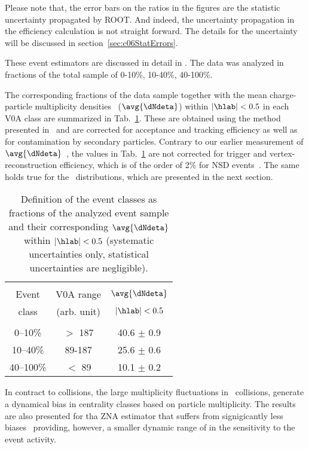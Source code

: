 Please note that,
the error bars on the ratios in the figures are the statistic uncertainty
propagated by ROOT.
And indeed, the uncertainty propagation in the efficiency calculation is not
straight forward.
The details for the uncertainty will be discussed
in section~\ref{sec:c06StatErrors}.

These event estimators are discussed in detail in \cite{Adam:2014qja}. The data was analyzed in fractions of the total sample of 0-10\%, 10-40\%, 40-100\%.

The corresponding fractions of the data sample together with the mean charge-particle multiplicity densities ~($\avg{\dNdeta}$) within $| \hlab |<0.5$ in each V0A class are summarized in Tab.~\ref{tab:multclasses}.
These are obtained using the method presented in~\cite{ALICE:2012xs} and are corrected for acceptance and
tracking efficiency as well as for contamination by secondary
particles. Contrary to our earlier measurement of $\avg{\dNdeta}$~\cite{ALICE:2012xs}, the values
in Tab.~\ref{tab:multclasses} are not corrected for trigger and
vertex-reconstruction efficiency, which is of the order of 2\% for NSD
events~\cite{ALICE:2012xs}. The same holds true for the \pt\
distributions, which are presented in the next section.

\begin{table}[t]
  \centering
  \begin{tabular*}{\linewidth}{@{\extracolsep{\fill}}ccc}
    \hline
    &&\\[-0.7em]
     Event & V0A range & $\avg{\dNdeta}$\\
     class & \footnotesize{(arb. unit)} & \footnotesize{$|\hlab|<0.5$}\\[0.3em]
    \hline
    &&\\[-0.7em]
    0--10\%   & $>$ 187  & 40.6 $\pm$ 0.9 \\[0.3em]
    10--40\%  & 89-187   & 25.6 $\pm$ 0.6 \\[0.3em]
    40--100\% & $<$ 89   & 10.1 $\pm$ 0.2 \\[0.3em]
    \hline
  \end{tabular*}
  \caption{Definition of the event classes as fractions of the analyzed event sample and their corresponding $\avg{\dNdeta}$ within $|\hlab|<0.5$ (systematic uncertainties only, statistical uncertainties are negligible).  }
  \label{tab:multclasses}
\end{table}

In contract to \PbPb collisions, the large multiplicity fluctuations in \pPb\ collisions, generate a dynamical bias in centrality classes based on particle multiplicity.
The results are also presented for tha ZNA estimator that suffers from signigicantly less biases~\cite{Adam:2014qja} providing, however, a smaller dynamic range of in the sensitivity to the event activity.


